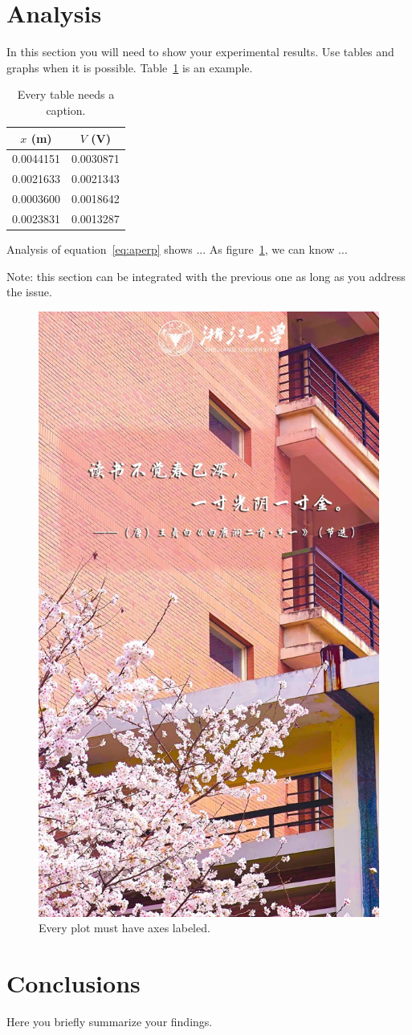 \documentclass[letterpaper,12pt]{article}
\begin{document}
\section{Analysis}

In this section you will need to show your experimental results. Use tables and graphs when it is possible. Table~\ref{tbl:bins} is an example.

\begin{table}[ht]
    \begin{center}
        \caption{Every table needs a caption.}
        \label{tbl:bins}
        \begin{tabular}{cc} 
            \hline
            \multicolumn{1}{|c}{$x$ (m)} & \multicolumn{1}{c|}{$V$ (V)} \\
            \hline
            0.0044151 &   0.0030871 \\
            0.0021633 &   0.0021343 \\
            0.0003600 &   0.0018642 \\
            0.0023831 &   0.0013287 \\
            \hline
        \end{tabular}
    \end{center}
\end{table}

Analysis of equation~\ref{eq:aperp} shows ... As figure~\ref{fig:exp_plots}, we can know ...

Note: this section can be integrated with the previous one as long as you address the issue.\cite{Cyr}

\begin{figure}[ht] 
  \centering
    \includegraphics[width=0.3\linewidth]{fig/photo.jpg}
    \caption{
        Every plot must have axes labeled.
    }
    \label{fig:exp_plots}
\end{figure}

\section{Conclusions}
Here you briefly summarize your findings.

\newpage


\end{document}

